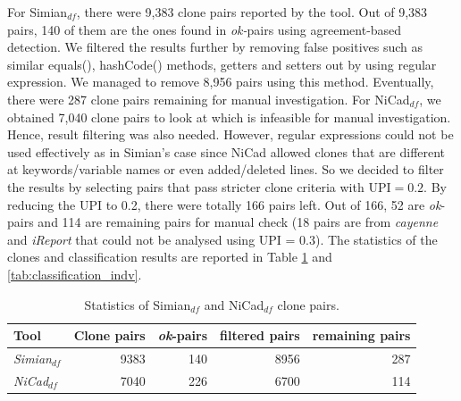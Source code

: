 \documentclass{sig-alternate-05-2015}
\begin{document}
For Simian$_{df}$, there were 9,383 clone pairs reported by the tool. Out of 9,383 pairs, 140 of them are the ones found in \textit{ok-}pairs using agreement-based detection. We filtered the results further by removing false positives such as similar equals(), hashCode() methods, getters and setters out by using regular expression. We managed to remove 8,956 pairs using this method. Eventually, there were 287 clone pairs remaining for manual investigation. For NiCad$_{df}$, we obtained 7,040 clone pairs to look at which is infeasible for manual investigation. Hence, result filtering was also needed. However, regular expressions could not be used effectively as in Simian's case since NiCad allowed clones that are different at keywords/variable names or even added/deleted lines. So we decided to filter the results by selecting pairs that pass stricter clone criteria with $\mathrm{UPI} = 0.2$. By reducing the UPI to 0.2, there were totally 166 pairs left. Out of 166, 52 are \textit{ok}-pairs and 114 are remaining pairs for manual check (18 pairs are from \textit{cayenne} and \textit{iReport} that could not be analysed using UPI = 0.3). The statistics of the clones and classification results are reported in Table \ref{tab:classification_indv_stats} and \ref{tab:classification_indv}.


\begin{table}
	\centering
	\caption{Statistics of Simian$_{df}$ and NiCad$_{df}$ clone pairs.}
	\label{tab:classification_indv_stats}
	\small
	\begin{tabular}{l|r|r|r|r}
		\hline 
		Tool & Clone pairs & \textit{ok}-pairs & filtered pairs & remaining pairs \\ 
		\hline 
		\multirow{1}{*}{\textit{Simian$_{df}$}} & 9383 & 140 & 8956 & 287 \\
		\hline
		\multirow{1}{*}{\textit{NiCad$_{df}$}} & 7040  & 226 & 6700 & 114 \\
		\hline
	\end{tabular} 
\end{table}
\end{document}
